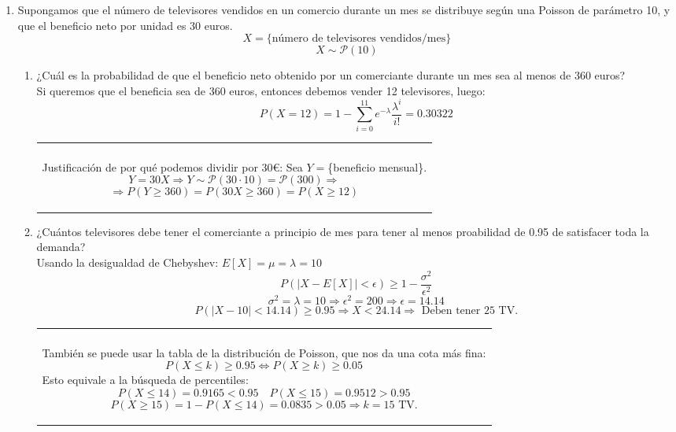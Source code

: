 \documentclass[11pt]{article}
\newcommand{\warning}{\textbf{\color{red}{ {\fontencoding{U}\fontfamily{futs}\selectfont\char 66\relax} }}}
\newenvironment{aclaration}    
{
\begin{center}
\begin{tabular}{|p{0.9\textwidth}|}
\hline \\ \warning
}{
\\\hline
\end{tabular} 
\end{center}
}
\begin{document}
\begin{enumerate}
\item Supongamos que el número de televisores vendidos en un comercio durante un mes se distribuye según una Poisson de parámetro 10, y que el beneficio neto por unidad es 30 euros.
\[
X = \{\text{número de televisores vendidos/mes}\}
\]
\[
X \sim \mathcal{P}(10)
\]
\begin{enumerate}
\item ¿Cuál es la probabilidad de que el beneficio neto obtenido por un comerciante durante un mes sea al menos de 360 euros? \\

Si queremos que el beneficia sea de 360 euros, entonces debemos vender 12 televisores, luego:
\[
P(X=12)=1-\sum_{i=0}^{11}e^{-\lambda}\frac{\lambda^i}{i!}=0.30322
\]

\begin{aclaration}
Justificación de por qué podemos dividir por 30\euro: Sea $Y=$\{beneficio mensual\}.
\[
Y=30X \Longrightarrow Y \sim \mathcal{P}(30\cdot 10)=\mathcal{P}(300)\Longrightarrow 
\]
\[
\Longrightarrow P(Y\geq 360)=P(30X\geq 360)=P(X\geq 12)
\]
\end{aclaration}

\item ¿Cuántos televisores debe tener el comerciante a principio de mes para tener al menos proabilidad de 0.95 de satisfacer toda la demanda?\\

Usando la desigualdad de Chebyshev: $E[X]=\mu=\lambda=10$
\[
P(|X-E[X]|< \epsilon) \geq 1 - \frac{\sigma^2}{\epsilon^2}
\]
\[
\sigma^2=\lambda=10 \Longrightarrow \epsilon^2=200 \Longrightarrow \epsilon = 14.14
\]
\[P(|X-10|< 14.14) \geq 0.95 \Longrightarrow X < 24.14 \Longrightarrow \text{ Deben tener 25 TV.}\]

\begin{aclaration}
También se puede usar la tabla de la distribución de Poisson, que nos da una cota más fina:
\[
P(X\leq k) \geq 0.95 \Longleftrightarrow P(X \geq k) \geq 0.05
\]
Esto equivale a la búsqueda de percentiles:
\[
P(X\leq 14) = 0.9165 < 0.95 \quad P(X\leq 15) = 0.9512 > 0.95
\]
\[
P(X\geq 15)=1-P(X\leq 14)=0.0835 > 0.05 \Longrightarrow k=15 \text{ TV.}
\]
\end{aclaration}
\end{enumerate}

\end{enumerate}
\end{document}
